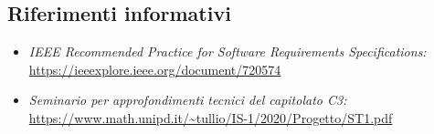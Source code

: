 \subsection{Riferimenti informativi}
\begin{itemize}
	\item \textit{IEEE Recommended Practice for Software Requirements Specifications:}\\
		\url{https://ieeexplore.ieee.org/document/720574}
	\item \textit{Seminario per approfondimenti tecnici del capitolato C3:}\\
		\url{https://www.math.unipd.it/~tullio/IS-1/2020/Progetto/ST1.pdf}		
\end{itemize}